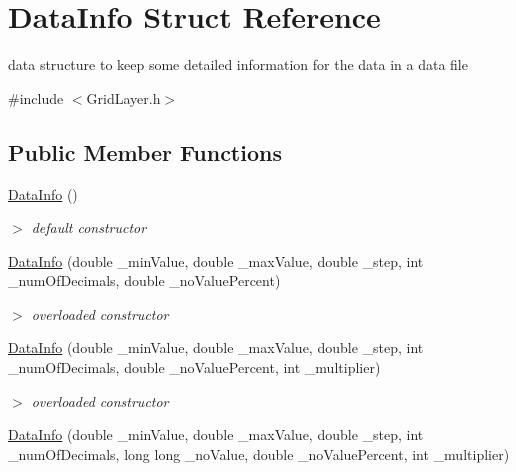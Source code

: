 \hypertarget{structDataInfo}{\section{\-Data\-Info \-Struct \-Reference}
\label{structDataInfo}
}


data structure to keep some detailed information for the data in a data file  




{\ttfamily \#include $<$\-Grid\-Layer.\-h$>$}

\subsection*{\-Public \-Member \-Functions}
\begin{DoxyCompactItemize}
\item 
\hypertarget{structDataInfo_a1bf2df99d22b1b70f5ff75e9ea922159}{\hyperlink{structDataInfo_a1bf2df99d22b1b70f5ff75e9ea922159}{\-Data\-Info} ()}\label{structDataInfo_a1bf2df99d22b1b70f5ff75e9ea922159}

\begin{DoxyCompactList}\small\item\em $>$ default constructor \end{DoxyCompactList}\item 
\hypertarget{structDataInfo_a9dff6ec607ca16850c116a67a068c19f}{\hyperlink{structDataInfo_a9dff6ec607ca16850c116a67a068c19f}{\-Data\-Info} (double \-\_\-min\-Value, double \-\_\-max\-Value, double \-\_\-step, int \-\_\-num\-Of\-Decimals, double \-\_\-no\-Value\-Percent)}\label{structDataInfo_a9dff6ec607ca16850c116a67a068c19f}

\begin{DoxyCompactList}\small\item\em $>$ overloaded constructor \end{DoxyCompactList}\item 
\hypertarget{structDataInfo_ac3b3bbbbd4b00009ab26b584247a6a63}{\hyperlink{structDataInfo_ac3b3bbbbd4b00009ab26b584247a6a63}{\-Data\-Info} (double \-\_\-min\-Value, double \-\_\-max\-Value, double \-\_\-step, int \-\_\-num\-Of\-Decimals, double \-\_\-no\-Value\-Percent, int \-\_\-multiplier)}\label{structDataInfo_ac3b3bbbbd4b00009ab26b584247a6a63}

\begin{DoxyCompactList}\small\item\em $>$ overloaded constructor \end{DoxyCompactList}\item 
\hypertarget{structDataInfo_ac4b1a7d495f257a9f06fa047b0b6bc4e}{\hyperlink{structDataInfo_ac4b1a7d495f257a9f06fa047b0b6bc4e}{\-Data\-Info} (double \-\_\-min\-Value, double \-\_\-max\-Value, double \-\_\-step, int \-\_\-num\-Of\-Decimals, long long \-\_\-no\-Value, double \-\_\-no\-Value\-Percent, int \-\_\-multiplier)}\label{structDataInfo_ac4b1a7d495f257a9f06fa047b0b6bc4e}


\end{DoxyCompactItemize}
